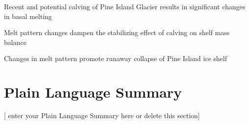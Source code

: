 \documentclass[draft]{agujournal2019}
\begin{document}

\begin{keypoints}
\item Recent and potential calving of Pine Island Glacier results in significant changes in basal melting
\item Melt pattern changes dampen the stabilizing effect of calving on shelf mass balance
\item Changes in melt pattern promote runaway collapse of Pine Island ice shelf  
\end{keypoints}

%
%

%
%


\begin{abstract}
[ enter your Abstract here ]
\end{abstract}

\section*{Plain Language Summary}
[ enter your Plain Language Summary here or delete this section]
\end{document}
